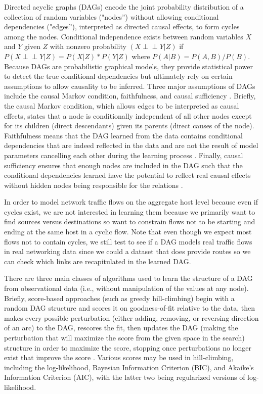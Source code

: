 \documentclass[conference]{IEEEtran}
\newcommand\ci{\perp\!\!\!\perp}
\begin{document}
Directed acyclic graphs (DAGs) encode the joint probability distribution of a collection of random variables ("nodes”) without allowing conditional dependencies ("edges”), interpreted as directed causal effects, to form cycles among the nodes. Conditional independence exists between random variables $X$ and $Y$ given $Z$ with nonzero probability $\left(X \ci Y | Z \right)$ if $P(X \ci Y | Z) = P(X | Z) * P(Y | Z)$ where $P(A | B) = P(A, B) / P(B)$. Because DAGs are probabilistic graphical models, they provide statistical power to detect the true conditional dependencies but ultimately rely on certain assumptions to allow causality to be inferred. Three major assumptions of DAGs include the causal Markov condition, faithfulness, and causal sufficiency \cite{b4}. Briefly, the causal Markov condition, which allows edges to be interpreted as causal effects, states that a node is conditionally independent of all other nodes except for its children (direct descendants) given its parents (direct causes of the node)\cite{b5}. Faithfulness means that the DAG learned from the data contains conditional dependencies that are indeed reflected in the data and are not the result of model parameters cancelling each other during the learning process \cite{b6}. Finally, causal sufficiency ensures that enough nodes are included in the DAG such that the conditional dependencies learned have the potential to reflect real causal effects without hidden nodes being responsible for the relations \cite{b6}.

In order to model network traffic flows on the aggregate host level because even if cycles exist, we are not interested in learning them because we primarily want to find sources versus destinations so want to constrain flows not to be starting and ending at the same host in a cyclic flow. Note that even though we expect most flows not to contain cycles, we still test to see if a DAG models real traffic flows in real networking data since we could a dataset that does provide routes so we can check which links are recapitulated in the learned DAG.

There are three main classes of algorithms used to learn the structure of a DAG from observational data (i.e., without manipulation of the values at any node). Briefly, score-based approaches (such as greedy hill-climbing) begin with a random DAG structure and scores it on goodness-of-fit relative to the data, then makes every possible perturbation (either adding, removing, or reversing direction of an arc) to the DAG, rescores the fit, then updates the DAG (making the perturbation that will maximize the score from the given space in the search) structure in order to maximize the score, stopping once perturbations no longer exist that improve the score \cite{b7}. Various scores may be used in hill-climbing, including the log-likelihood, Bayesian Information Criterion (BIC), and Akaike's Information Criterion (AIC), with the latter two being regularized versions of log-likelihood.
\end{document}
